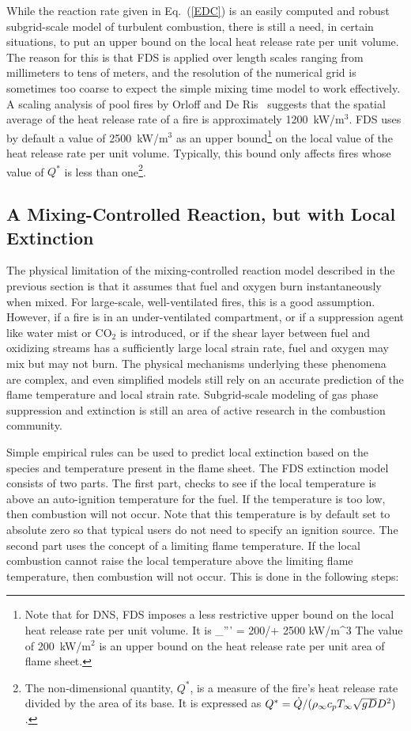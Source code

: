 While the reaction rate given in Eq.~(\ref{EDC}) is an easily computed and robust subgrid-scale model of
turbulent combustion, there is still a need, in certain situations, to put an upper bound on the local heat release rate per unit volume. The reason for
this is that FDS is applied over length scales ranging from millimeters to tens of meters, and the resolution of the numerical grid
is sometimes too coarse to expect the simple mixing time model to work effectively.
A scaling analysis of pool fires by Orloff and De Ris~\cite{Orloff:19th_Symposium} suggests that the spatial average of the
heat release rate of a fire is approximately 1200~kW/m$^3$. FDS uses by default a value of 2500~kW/m$^3$ as an upper bound\footnote{Note that
for DNS, FDS imposes a less restrictive upper bound on the local heat release rate per unit volume. It is
\be \dq_{\max}''' = 200/\dx + 2500 \quad \hbox{kW/m}^3 \ee
The value of 200~kW/m$^2$ is an upper bound on the heat release rate per unit area of flame sheet.}
on the local value of the heat release rate per unit volume. Typically, this bound only affects fires whose value of $Q^*$
is less than one\footnote{The non-dimensional quantity, $Q^*$, is a measure of the fire's heat release rate divided by the
area of its base. It is expressed as $Q^*=\dot{Q}/(\rho_\infty c_p T_\infty \sqrt{g D} D^2)$.}.

\subsection{A Mixing-Controlled Reaction, but with Local Extinction}

\label{extinction}

The physical limitation of the mixing-controlled reaction model described in the previous section is that it assumes that fuel and oxygen burn instantaneously when mixed. For large-scale, well-ventilated
fires, this is a good assumption. However, if a fire is in an
under-ventilated compartment, or if a suppression agent like water
mist or CO$_2$ is introduced, or if the shear layer between fuel and oxidizing streams
has a sufficiently large local strain rate,
fuel and oxygen may mix but may not burn.
The physical mechanisms underlying these phenomena are complex, and
even simplified models still rely on an accurate prediction
of the flame temperature and local strain rate.
Subgrid-scale modeling of gas phase suppression and
extinction is still an area of active research in the combustion
community.

Simple empirical rules can be used to predict local
extinction based on the species and temperature present in the flame sheet.  The FDS extinction model consists of two parts. The first part, checks to see if the local temperature is above an auto-ignition temperature for the fuel.  If the temperature is too low, then combustion will not occur.  Note that this temperature is by default set to absolute zero so that typical users do not need to specify an ignition source.  The second part uses the concept of a limiting flame temperature.  If the local combustion cannot raise the local temperature above the limiting flame temperature, then combustion will not occur.  This is done in the following steps:

